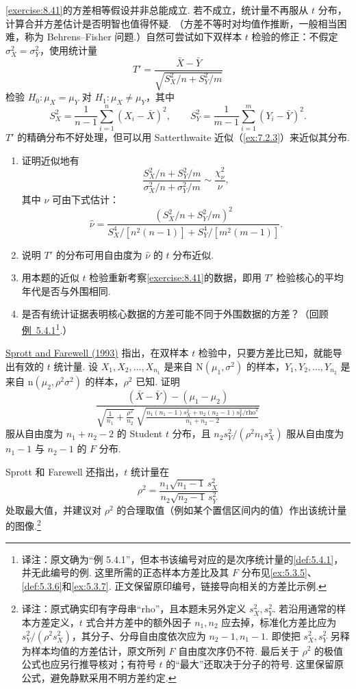 \begin{exercise}\label{exercise:8.42}
\autoref{exercise:8.41}的方差相等假设并非总能成立. 若不成立，统计量不再服从 $t$ 分布，计算合并方差估计是否明智也值得怀疑. （方差不等时对均值作推断，一般相当困难，称为 Behrens–Fisher 问题.）自然可尝试如下双样本 $t$ 检验的修正：不假定 $\sigma_X^2=\sigma_Y^2$，使用统计量
$$T'=\frac{\bar X-\bar Y}{\sqrt{S_X^2/n+S_Y^2/m}}$$
检验 $H_0:\mu_X=\mu_Y$ 对 $H_1:\mu_X\ne\mu_Y$，其中
$$S_X^2=\frac1{n-1}\sum_{i=1}^n(X_i-\bar X)^2,\qquad
S_Y^2=\frac1{m-1}\sum_{i=1}^m(Y_i-\bar Y)^2.$$
$T'$ 的精确分布不好处理，但可以用 Satterthwaite 近似（\autoref{ex:7.2.3}）来近似其分布.
\begin{enumerate}
\item 证明近似地有
$$\frac{S_X^2/n+S_Y^2/m}{\sigma_X^2/n+\sigma_Y^2/m}\sim\frac{\chi_\nu^2}{\nu},$$
其中 $\nu$ 可由下式估计：
$$\hat\nu=\frac{(S_X^2/n+S_Y^2/m)^2}{S_X^4/[n^2(n-1)]+S_Y^4/[m^2(m-1)]}.$$
\item 说明 $T'$ 的分布可用自由度为 $\hat\nu$ 的 $t$ 分布近似.
\item 用本题的近似 $t$ 检验重新考察\autoref{exercise:8.41}的数据，即用 $T'$ 检验核心的平均年代是否与外围相同.
\item 是否有统计证据表明核心数据的方差可能不同于外围数据的方差？（回顾\hyperref[ex:5.3.5]{例~5.4.1}\footnote{译注：原文确为“例 5.4.1”，但本书该编号对应的是次序统计量的\autoref{def:5.4.1}，并无此编号的例. 这里所需的正态样本方差比及其 $F$ 分布见\autoref{ex:5.3.5}、\autoref{def:5.3.6}和\autoref{ex:5.3.7}. 正文保留原印编号，链接导向相关的方差比示例.}.）
\end{enumerate}
\end{exercise}
\begin{exercise}\label{exercise:8.43}
\hyperref[bib:source298]{Sprott and Farewell (1993)} 指出，在双样本 $t$ 检验中，只要方差比已知，就能导出有效的 $t$ 统计量. 设 $X_1,X_2,\ldots,X_{n_1}$ 是来自 $\mathrm N(\mu_1,\sigma^2)$ 的样本，$Y_1,Y_2,\ldots,Y_{n_2}$ 是来自 $\mathrm n(\mu_2,\rho^2\sigma^2)$ 的样本，$\rho^2$ 已知. 证明
$$\frac{(\bar X-\bar Y)-(\mu_1-\mu_2)}{
\sqrt{\frac1{n_1}+\frac{\rho^2}{n_2}}\,
\sqrt{\frac{n_1(n_1-1)s_X^2+n_2(n_2-1)s_Y^2/\mathrm{rho}^2}{n_1+n_2-2}}}$$
服从自由度为 $n_1+n_2-2$ 的 Student $t$ 分布，且 $n_2s_Y^2/(\rho^2n_1s_X^2)$ 服从自由度为 $n_1-1$ 与 $n_2-1$ 的 $F$ 分布.

Sprott 和 Farewell 还指出，$t$ 统计量在
$$\rho^2=\frac{n_1\sqrt{n_1-1}\,s_X^2}{n_2\sqrt{n_2-1}\,s_Y^2}$$
处取最大值，并建议对 $\rho^2$ 的合理取值（例如某个置信区间内的值）作出该统计量的图像.\footnote{译注：原式确实印有字母串“rho”，且本题未另外定义 $s_X^2,s_Y^2$. 若沿用通常的样本方差定义，$t$ 式合并方差中的额外因子 $n_1,n_2$ 应去掉，标准化方差比应为 $s_Y^2/(\rho^2s_X^2)$，其分子、分母自由度依次应为 $n_2-1,n_1-1$. 即使把 $s_X^2,s_Y^2$ 另释为样本均值的方差估计，原文所列 $F$ 自由度次序仍不符. 最后关于 $\rho^2$ 的极值公式也应另行推导核对；有符号 $t$ 的“最大”还取决于分子的符号. 这里保留原公式，避免静默采用不明方差约定.}
\end{exercise}
